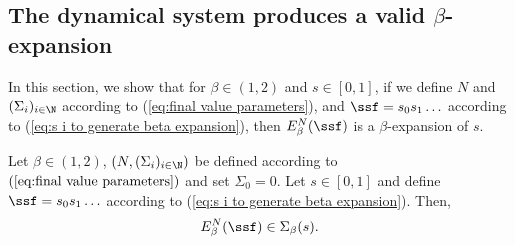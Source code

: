 \subsection{\texorpdfstring{The dynamical system produces a valid $\beta$-expansion}{}}

\label{sec:control of X and Z}

In this section, we show that for $\beta \in (1,2)$ and $s \in [0,1]$, if we define $N$ and $(\Sigma_i)_{i \in \N}$ according to (\ref{eq:final value parameters}), and $\ssf = s_0s_1\ldots $ according to (\ref{eq:s i to generate beta expansion}), then $E_\beta^N(\ssf)$ is a $\beta$-expansion of $s$.

\begin{theorem}\label{thm:convergence rational dynamical system to beta expansion}
	Let $\beta \in (1,2)$, $(N,(\Sigma_i)_{i \in \N})$ be defined according to $(\ref{eq:final value parameters})$ and set $\Sigma_0 = 0$. Let $s \in [0,1]$ and define $\ssf = s_0s_1\ldots$ according to (\ref{eq:s i to generate beta expansion}). Then,
	\begin{equation}
		E_\beta^N(\ssf) \in \Sigma_\beta(s).
	\end{equation}
\end{theorem}
